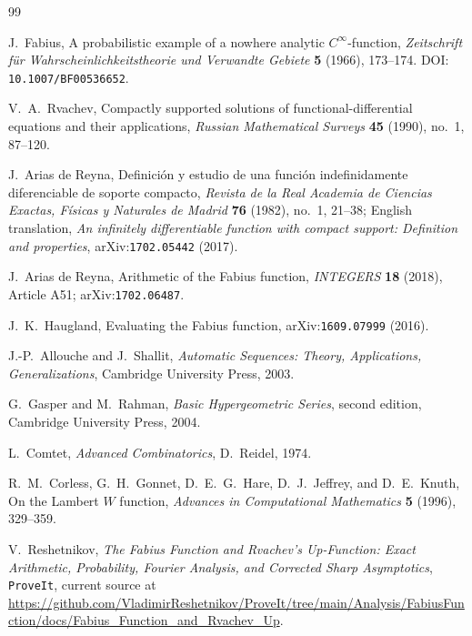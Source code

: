\documentclass[11pt,oneside]{article}
\theoremstyle{definition}
\theoremstyle{remark}
\newcommand{\1}{\mathbf 1}
\begin{document}
\begin{thebibliography}{99}

J.~Fabius,
\newblock A probabilistic example of a nowhere analytic $C^\infty$-function,
\newblock \emph{Zeitschrift f\"ur Wahrscheinlichkeitstheorie und Verwandte Gebiete}
\textbf{5} (1966), 173--174.
\newblock DOI: \nolinkurl{10.1007/BF00536652}.

V.~A.~Rvachev,
\newblock Compactly supported solutions of functional-differential equations and their applications,
\newblock \emph{Russian Mathematical Surveys} \textbf{45} (1990), no.~1, 87--120.

J.~Arias de Reyna,
\newblock Definici\'on y estudio de una funci\'on indefinidamente diferenciable de soporte compacto,
\newblock \emph{Revista de la Real Academia de Ciencias Exactas, F\'isicas y Naturales de Madrid}
\textbf{76} (1982), no.~1, 21--38;
English translation, \emph{An infinitely differentiable function with compact support: Definition and properties}, arXiv:\nolinkurl{1702.05442} (2017).

J.~Arias de Reyna,
\newblock Arithmetic of the Fabius function,
\newblock \emph{INTEGERS} \textbf{18} (2018), Article A51;
arXiv:\nolinkurl{1702.06487}.

J.~K.~Haugland,
\newblock Evaluating the Fabius function,
\newblock arXiv:\nolinkurl{1609.07999} (2016).

J.-P.~Allouche and J.~Shallit,
\newblock \emph{Automatic Sequences: Theory, Applications, Generalizations},
\newblock Cambridge University Press, 2003.

G.~Gasper and M.~Rahman,
\newblock \emph{Basic Hypergeometric Series}, second edition,
\newblock Cambridge University Press, 2004.

L.~Comtet,
\newblock \emph{Advanced Combinatorics},
\newblock D.~Reidel, 1974.

R.~M.~Corless, G.~H.~Gonnet, D.~E.~G.~Hare, D.~J.~Jeffrey, and D.~E.~Knuth,
\newblock On the Lambert $W$ function,
\newblock \emph{Advances in Computational Mathematics} \textbf{5} (1996), 329--359.

V.~Reshetnikov,
\newblock \emph{The Fabius Function and Rvachev's Up-Function: Exact Arithmetic,
Probability, Fourier Analysis, and Corrected Sharp Asymptotics},
\newblock \texttt{ProveIt}, current source at
\url{https://github.com/VladimirReshetnikov/ProveIt/tree/main/Analysis/FabiusFunction/docs/Fabius_Function_and_Rvachev_Up}.


\end{thebibliography}
\end{document}
